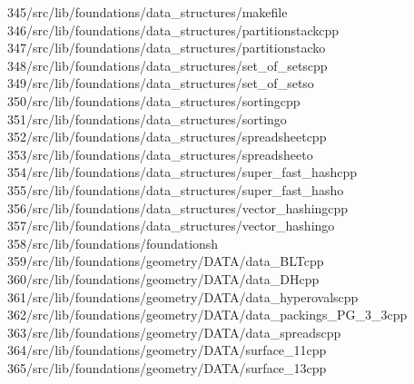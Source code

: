 \begin{tabbing}
345\>/src/lib/foundations/data\_structures/makefile\\[0pt]
346\>/src/lib/foundations/data\_structures/partitionstackcpp\\[0pt]
347\>/src/lib/foundations/data\_structures/partitionstacko\\[0pt]
348\>/src/lib/foundations/data\_structures/set\_of\_setscpp\\[0pt]
349\>/src/lib/foundations/data\_structures/set\_of\_setso\\[0pt]
350\>/src/lib/foundations/data\_structures/sortingcpp\\[0pt]
351\>/src/lib/foundations/data\_structures/sortingo\\[0pt]
352\>/src/lib/foundations/data\_structures/spreadsheetcpp\\[0pt]
353\>/src/lib/foundations/data\_structures/spreadsheeto\\[0pt]
354\>/src/lib/foundations/data\_structures/super\_fast\_hashcpp\\[0pt]
355\>/src/lib/foundations/data\_structures/super\_fast\_hasho\\[0pt]
356\>/src/lib/foundations/data\_structures/vector\_hashingcpp\\[0pt]
357\>/src/lib/foundations/data\_structures/vector\_hashingo\\[0pt]
358\>/src/lib/foundations/foundationsh\\[0pt]
359\>/src/lib/foundations/geometry/DATA/data\_BLTcpp\\[0pt]
360\>/src/lib/foundations/geometry/DATA/data\_DHcpp\\[0pt]
361\>/src/lib/foundations/geometry/DATA/data\_hyperovalscpp\\[0pt]
362\>/src/lib/foundations/geometry/DATA/data\_packings\_PG\_3\_3cpp\\[0pt]
363\>/src/lib/foundations/geometry/DATA/data\_spreadscpp\\[0pt]
364\>/src/lib/foundations/geometry/DATA/surface\_11cpp\\[0pt]
365\>/src/lib/foundations/geometry/DATA/surface\_13cpp\\[0pt]

\end{tabbing}
